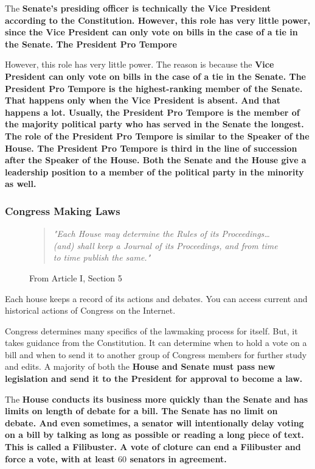 The \bf{Senate's} presiding officer is technically the \bf{Vice President} according to the Constitution. However, this role has very little power, since the \bf{Vice President} can only vote on bills in the case of a tie in the \bf{Senate}. The \bf{President Pro Tempore}

However, this role has very little power. The reason is because the \bf{Vice President} can only vote on bills in the case of a tie in the \bf{Senate}. The \bf{President Pro Tempore} is the highest-ranking member of the \bf{Senate}. That happens only when the \bf{Vice President} is absent. And that happens a lot. Usually, the \bf{President Pro Tempore} is the member of the majority political party who has served in the \bf{Senate} the longest. The role of the \bf{President Pro Tempore} is similar to the \bf{Speaker of the House}. The \bf{President Pro Tempore} is third in the line of succession after the Speaker of the House. Both the \bf{Senate} and the \bf{House} give a leadership position to a member of the political party in the minority as well.

\subsubsection*{Congress Making Laws}

\begin{figure}[h]
    \begin{quote}
        \it{"Each House may determine the Rules of its Proceedings… (and) shall keep a Journal of its Proceedings, and from time to time publish the same."}
    \end{quote}
    \caption{From Article I, Section 5}
\end{figure}

Each house keeps a record of its actions and debates. You can access current and historical actions of Congress on the Internet.

Congress determines many specifics of the lawmaking process for itself. But, it takes guidance from the Constitution. It can determine when to hold a vote on a bill and when to send it to another group of Congress members for further study and edits. A majority of both the \bf{House} and \bf{Senate} must pass new legislation and send it to the \bf{President} for approval to become a law.

The \bf{House} conducts its business more quickly than the \bf{Senate} and has limits on length of debate for a bill. The \bf{Senate} has no limit on debate. And even sometimes, a senator will intentionally delay voting on a bill by talking as long as possible or reading a long piece of text. This is called a \bf{Filibuster}. A vote of cloture can end a \bf{Filibuster} and force a vote, with at least $60$ senators in agreement.

